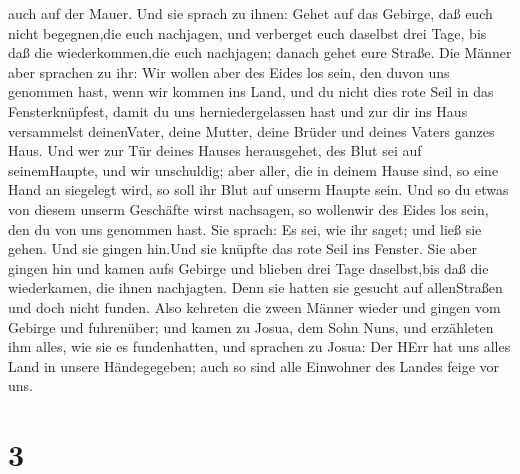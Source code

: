 auch auf der Mauer.  Und sie sprach zu ihnen: Gehet auf das
Gebirge, daß euch nicht begegnen,die euch nachjagen, und verberget euch
daselbst drei Tage, bis daß die wiederkommen,die euch nachjagen; danach
gehet eure Straße.  Die Männer aber sprachen zu ihr: Wir
wollen aber des Eides los sein, den duvon uns genommen hast,
 wenn wir kommen ins Land, und du nicht dies rote Seil in
das Fensterknüpfest, damit du uns herniedergelassen hast und zur dir ins
Haus versammelst deinenVater, deine Mutter, deine Brüder und deines
Vaters ganzes Haus.  Und wer zur Tür deines Hauses
herausgehet, des Blut sei auf seinemHaupte, und wir unschuldig; aber
aller, die in deinem Hause sind, so eine Hand an siegelegt wird, so soll
ihr Blut auf unserm Haupte sein.  Und so du etwas von
diesem unserm Geschäfte wirst nachsagen, so wollenwir des Eides los
sein, den du von uns genommen hast.  Sie sprach: Es sei,
wie ihr saget; und ließ sie gehen. Und sie gingen hin.Und sie knüpfte
das rote Seil ins Fenster.  Sie aber gingen hin und kamen
aufs Gebirge und blieben drei Tage daselbst,bis daß die wiederkamen, die
ihnen nachjagten. Denn sie hatten sie gesucht auf allenStraßen und doch
nicht funden.  Also kehreten die zween Männer wieder und
gingen vom Gebirge und fuhrenüber; und kamen zu Josua, dem Sohn Nuns,
und erzähleten ihm alles, wie sie es fundenhatten,  und
sprachen zu Josua: Der HErr hat uns alles Land in unsere Händegegeben;
auch so sind alle Einwohner des Landes feige vor uns.

\hypertarget{section-2}{%
\section{3}\label{section-2}}

